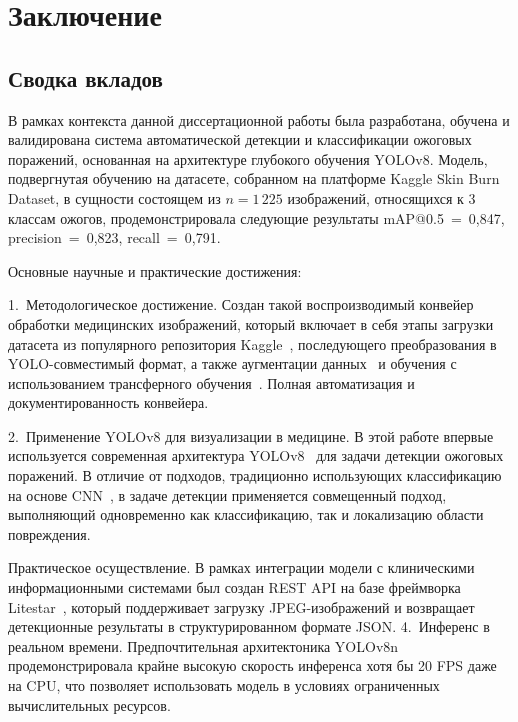 \chapter{Заключение}
\label{chap:conclusion}
\setlength{\parskip}{0.8em}
\section{Сводка вкладов}
В рамках контекста данной диссертационной работы была разработана, обучена и валидирована система автоматической детекции и классификации ожоговых поражений, основанная на архитектуре глубокого обучения YOLOv8. Модель, подвергнутая обучению на датасете, собранном на платформе Kaggle Skin Burn Dataset, в сущности состоящем из $n{=}1\,225$ изображений, относящихся к 3 классам ожогов, продемонстрировала следующие результаты mAP@0.5~=~0{,}847, precision~=~0{,}823, recall~=~0{,}791.

Основные научные и практические достижения:

1.~Методологическое достижение. Создан такой воспроизводимый конвейер обработки медицинских изображений, который включает в себя этапы загрузки датасета из популярного репозитория Kaggle~\cite{kaggle_burn_dataset}, последующего преобразования в YOLO-совместимый формат, а также аугментации данных~\cite{shorten2019augmentation} и обучения с использованием трансферного обучения~\cite{yosinski2014transfer}. Полная автоматизация и документированность конвейера.

2.~Применение YOLOv8 для визуализации в медицине. В этой работе впервые используется современная архитектура YOLOv8~\cite{ultralytics2023yolov8} для задачи детекции ожоговых поражений. В отличие от подходов, традиционно использующих классификацию на основе CNN~\cite{he2016resnet,simonyan2014vgg,huang2017densenet}, в задаче детекции применяется совмещенный подход, выполняющий одновременно как классификацию, так и локализацию области повреждения.

Практическое осуществление. В рамках интеграции модели с клиническими информационными системами был создан REST API на базе фреймворка Litestar~\cite{litestar2023}, который поддерживает загрузку JPEG-изображений и возвращает детекционные результаты в структурированном формате JSON.
4.~Инференс в реальном времени. Предпочтительная архитектоника YOLOv8n продемонстрировала крайне высокую скорость инференса хотя бы 20 FPS даже на CPU, что позволяет использовать модель в условиях ограниченных вычислительных ресурсов.

